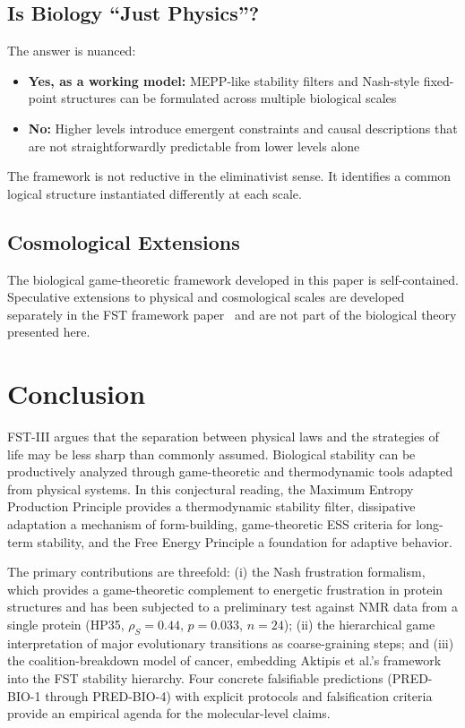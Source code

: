 \documentclass[12pt,a4paper]{article}
\theoremstyle{remark}
\begin{document}
\subsection{Is Biology ``Just Physics''?}

The answer is nuanced:
\begin{itemize}
    \item \textbf{Yes, as a working model:} MEPP-like stability filters and Nash-style fixed-point structures can be formulated across multiple biological scales
    \item \textbf{No:} Higher levels introduce emergent constraints and causal descriptions that are not straightforwardly predictable from lower levels alone
\end{itemize}

The framework is not reductive in the eliminativist sense. It identifies a common logical structure instantiated differently at each scale.

\subsection{Cosmological Extensions}
\label{sec:cosmology}

The biological game-theoretic framework developed in this paper is self-contained. Speculative extensions to physical and cosmological scales are developed separately in the FST framework paper~\citep{FST-Unified2026} and are not part of the biological theory presented here.

\section{Conclusion}
\label{sec:conclusion}

FST-III argues that the separation between physical laws and the strategies of life may be less sharp than commonly assumed. Biological stability can be productively analyzed through game-theoretic and thermodynamic tools adapted from physical systems. In this conjectural reading, the Maximum Entropy Production Principle provides a thermodynamic stability filter, dissipative adaptation a mechanism of form-building, game-theoretic ESS criteria for long-term stability, and the Free Energy Principle a foundation for adaptive behavior.

The primary contributions are threefold: (i) the Nash frustration formalism, which provides a game-theoretic complement to energetic frustration in protein structures and has been subjected to a preliminary test against NMR data from a single protein (HP35, $\rho_S = 0.44$, $p = 0.033$, $n = 24$); (ii) the hierarchical game interpretation of major evolutionary transitions as coarse-graining steps; and (iii) the coalition-breakdown model of cancer, embedding Aktipis et al.'s framework into the FST stability hierarchy. Four concrete falsifiable predictions (PRED-BIO-1 through PRED-BIO-4) with explicit protocols and falsification criteria provide an empirical agenda for the molecular-level claims.
\end{document}
